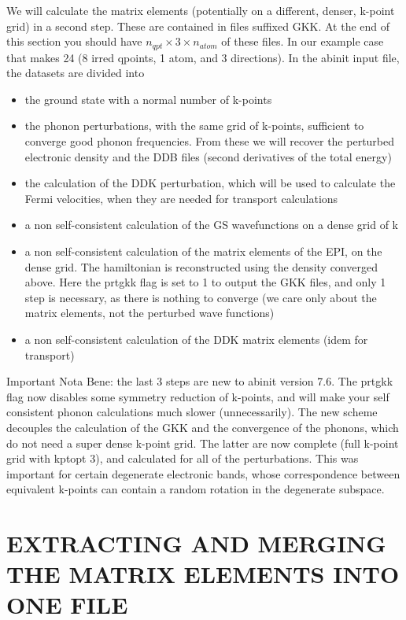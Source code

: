 \documentclass[aps,preprint]{revtex4-1}
\begin{document}
We will calculate the matrix elements (potentially on a different, denser,
k-point grid) in a second step. These are contained in files suffixed GKK. At
the end of this section you should have $n_{qpt} \times 3 \times n_{atom}$ of
these files. In our example case that makes 24 (8 irred qpoints, 1 atom, and 3
directions). In the abinit input file, the datasets are divided into
\begin{itemize}
\item the ground state with a normal number of k-points
\item the phonon perturbations, with the same grid of k-points, sufficient to
converge good phonon frequencies. From these we will recover the perturbed
electronic density and the DDB files (second derivatives of the total energy)
\item the calculation of the DDK perturbation, which will be used to calculate
the Fermi velocities, when they are needed for transport calculations
\item a non self-consistent calculation of the GS wavefunctions on a dense grid
of k
\item a non self-consistent calculation of the matrix elements of the EPI, on
the dense grid. The hamiltonian is reconstructed using the density converged
above. Here the prtgkk flag is set to 1 to output the GKK files, and only 1
step is necessary, as there is nothing to converge (we care only about the
matrix elements, not the perturbed wave functions)
\item a non self-consistent calculation of the DDK matrix elements (idem for transport)
\end{itemize}

Important Nota Bene: the last 3 steps are new to abinit version 7.6. The prtgkk flag now
disables some symmetry reduction of k-points, and will make your self
consistent phonon calculations much slower (unnecessarily). The new scheme
decouples the calculation of the GKK and the convergence of the phonons, which
do not need a super dense k-point grid. The latter are now complete (full
k-point grid with kptopt 3), and calculated for all of the perturbations. This
was important for certain degenerate electronic bands, whose correspondence
between equivalent k-points can contain a random rotation in the degenerate
subspace.


\section{EXTRACTING AND MERGING THE MATRIX ELEMENTS INTO ONE FILE}
\end{document}
